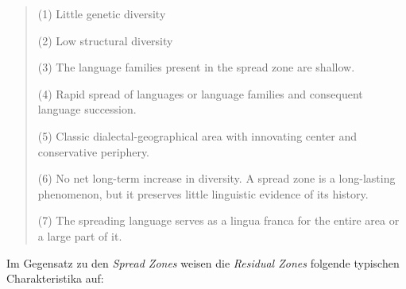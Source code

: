 \begin{quote}


(1) Little genetic diversity


(2) Low structural diversity


(3) The language families present in the spread zone are shallow.


(4) Rapid spread of languages or language families and consequent language succession.


(5) Classic dialectal-geographical area with innovating center and conservative periphery.


(6) No net long-term increase in diversity. A spread zone is a long-lasting phenomenon, but it preserves little linguistic evidence of its history.


(7) The spreading language serves as a lingua franca for the entire area or a large part of it.


\citep[16--17]{Nichols1992}
\end{quote}

\noindent
Im Gegensatz zu den \textit{Spread Zones} weisen die \textit{Residual Zones} folgende typischen Charakteristika auf:

